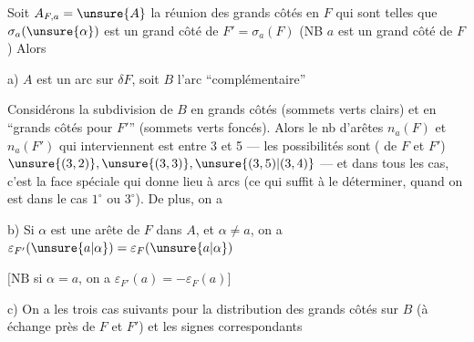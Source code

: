 Soit \(A_{F,a}=\unsure{A}\) la réunion des grands côtés en \(F\) qui sont telles que \(\sigma_a(\unsure{\alpha})\) est un grand côté de \(F'=\sigma_a(F)\) (NB \(a\) est un grand côté de \(F\)) Alors

a) \(A\) est un arc sur \(\delta F\), soit \(B\) l'arc ``complémentaire''

 Considérons la subdivision de \(B\) en grands côtés (sommets verts clairs) et en ``grands côtés pour \(F'\)'' (sommets verts foncés). Alors le nb d'arêtes \(n_a(F)\) et \(n_a(F')\) qui interviennent est  entre 3 et 5 --- les possibilités sont ( de \(F\) et \(F'\)) \(\unsure{(3,2)},\unsure{(3,3)},\unsure{(3,5)|(3,4)}\)  --- et dans tous les cas, c'est la face spéciale qui donne lieu à  arcs (ce qui suffit à le déterminer, quand on est dans le cas \(1^\circ\) ou \(3^\circ\)). De plus, on a

b) Si \(\alpha\) est une arête de \(F\) dans \(A\),  et \(\alpha\ne a\), on a \(\varepsilon_{F'}(\unsure{a|\alpha})=\varepsilon_F(\unsure{a|\alpha})\)

\([\mathrm{NB}\) si \(\alpha=a\), on a \(\varepsilon_{F'}(a)=-\varepsilon_F(a)]\)

c) On a les  trois cas suivants pour la distribution des grands côtés sur \(B\) (à échange près de \(F\) et \(F'\)) et les signes correspondants

